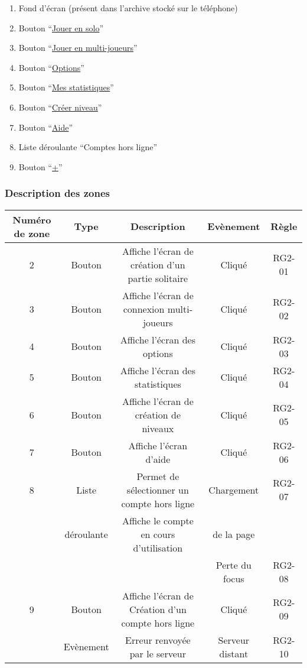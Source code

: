 \documentclass{report}
\begin{document}
		\begin{center}	
			
		\end{center}

		\begin{enumerate}
		  \item Fond d'écran (présent dans l'archive stocké sur le téléphone)
		  \item Bouton ``\hyperlink{Creer partie solo}{Jouer en solo}''
		  \item Bouton ``\hyperlink{Connexion multi-joueurs}{Jouer en multi-joueurs}''
		  \item Bouton ``\hyperlink{Options}{Options}''
		  \item Bouton ``\hyperlink{Statistiques}{Mes statistiques}''
		  \item Bouton ``\hyperlink{Creer niveau}{Créer niveau}''
		  \item Bouton ``\hyperlink{Aide}{Aide}''
		  \item Liste déroulante ``Comptes hors ligne''
		  \item Bouton ``\hyperlink{profil}{+}''
		\end{enumerate}

		\subsubsection{Description des zones}
		
		\begin{tabular}{|c|c|c|c|c|} \hline
			Numéro de zone & Type  & Description & Evènement &	Règle \\\hline 
			2 & Bouton & Affiche l'écran de création d'un partie solitaire & Cliqué & RG2-01 \\\hline
			3 & Bouton & Affiche l'écran de connexion multi-joueurs & Cliqué & RG2-02 \\\hline
			4 & Bouton & Affiche l'écran des options & Cliqué & RG2-03 \\\hline
			5 & Bouton & Affiche l'écran des statistiques & Cliqué & RG2-04 \\\hline
			6 & Bouton & Affiche l'écran de création de niveaux & Cliqué & RG2-05 \\\hline
			7 & Bouton & Affiche l'écran d'aide & Cliqué & RG2-06 \\\hline
			8 & Liste & Permet de sélectionner un compte hors ligne & Chargement  & RG2-07 \\ 
			  & déroulante & Affiche le compte en cours d'utilisation & de la page & \\
			  &            &                                          & Perte du focus & RG2-08\\\hline
			9 & Bouton & Affiche l'écran de Création d'un compte hors ligne & Cliqué & RG2-09 \\\hline
			  & Evènement & Erreur renvoyée par le serveur & Serveur distant & RG2-10 \\\hline
			
		\end{tabular}
		
\end{document}

